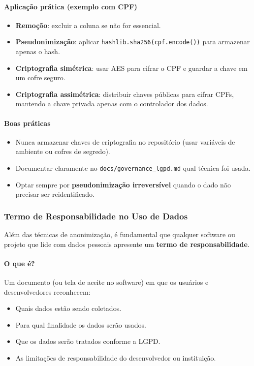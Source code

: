 \documentclass[12pt,a4paper]{article}
\begin{document}
\paragraph{Aplicação prática (exemplo com CPF)}  
\begin{itemize}
  \item \textbf{Remoção}: excluir a coluna se não for essencial.  
  \item \textbf{Pseudonimização}: aplicar \lstinline|hashlib.sha256(cpf.encode())| para armazenar apenas o hash.  
  \item \textbf{Criptografia simétrica}: usar AES para cifrar o CPF e guardar a chave em um cofre seguro.  
  \item \textbf{Criptografia assimétrica}: distribuir chaves públicas para cifrar CPFs, mantendo a chave privada apenas com o controlador dos dados.  
\end{itemize}

\paragraph{Boas práticas}  
\begin{itemize}
  \item Nunca armazenar chaves de criptografia no repositório (usar variáveis de ambiente ou cofres de segredo).  
  \item Documentar claramente no \texttt{docs/governance\_lgpd.md} qual técnica foi usada.  
  \item Optar sempre por \textbf{pseudonimização irreversível} quando o dado não precisar ser reidentificado.  
\end{itemize}

\subsubsection{Termo de Responsabilidade no Uso de Dados}

Além das técnicas de anonimização, é fundamental que qualquer software ou projeto que lide com dados pessoais apresente um \textbf{termo de responsabilidade}.  

\paragraph{O que é?}  
Um documento (ou tela de aceite no software) em que os usuários e desenvolvedores reconhecem:  
\begin{itemize}
  \item Quais dados estão sendo coletados.  
  \item Para qual finalidade os dados serão usados.  
  \item Que os dados serão tratados conforme a LGPD.  
  \item As limitações de responsabilidade do desenvolvedor ou instituição.  
\end{itemize}
\end{document}
